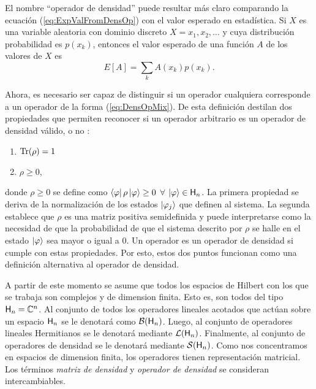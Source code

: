 El nombre ``operador de densidad'' puede resultar más claro comparando la ecuación (\ref{eq:ExpValFromDensOp}) con el valor esperado en estadística. Si $X$ es una variable aleatoria con dominio discreto $X=x_1,x_2,\dots$ y cuya distribución probabilidad es $p(x_k)$, entonces el valor esperado de una función $A$ de los valores de $X$ es
\begin{equation}
E[A]=\sum_{k} A(x_k) p(x_k).\nonumber
\end{equation}

Ahora, es necesario ser capaz de distinguir si un operador cualquiera corresponde a un operador de la forma (\ref{eq:DensOpMix}). De esta definición destilan dos propiedades que permiten reconocer si un operador arbitrario es un operador de densidad válido, o no \cite{Holevo}:
\begin{enumerate}
    \item $\Tr(\rho)=1$
    \item $\rho\geq 0$,
\end{enumerate}
donde $\rho\geq 0$ se define como $\bra{\varphi}\rho\ket{\varphi}\geq 0$ $\forall$ $\ket{\varphi}\in{\sf H}_{n}$.
La primera propiedad se deriva de la normalización de los estados $\ket{\varphi_{j}}$ que definen al sistema. La segunda establece que $\rho$ es una matriz positiva semidefinida y puede interpretarse como la necesidad de que la probabilidad de que el sistema descrito por $\rho$ se halle en el estado $\ket{\varphi}$ sea mayor o igual a $0$. Un operador es un operador de densidad si cumple con estas propiedades. Por esto, estos dos puntos funcionan como una definición alternativa al operador de densidad.


A partir de este momento se asume que todos los espacios de Hilbert con los que se trabaja son complejos y de dimension finita. Esto es, son todos del tipo ${\sf H}_{n}=\mathbb{C}^{n}$. Al conjunto de todos los operadores lineales acotados que actúan sobre un espacio ${\sf H}_{n}$ se le denotará como $\mathcal{B}({\sf H}_{n})$. Luego, al conjunto de operadores lineales Hermitianos se le denotará mediante $\mathcal{L}({\sf H}_{n})$. Finalmente, al conjunto de operadores de densidad se le denotará mediante $\mathcal{S}({\sf H}_{n})$. Como nos concentramos en espacios de dimension finita, los operadores tienen representación matricial. Los términos \textit{matriz de densidad} y \textit{operador de densidad} se consideran intercambiables.




